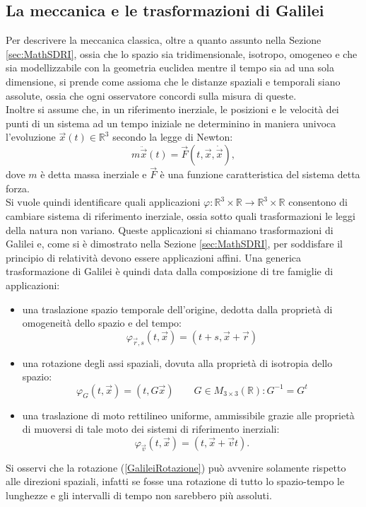 \subsection{La meccanica e le trasformazioni di Galilei}\label{sec:MC}
Per descrivere la meccanica classica, oltre a quanto assunto nella Sezione \ref{sec:MathSDRI}, ossia che lo spazio sia tridimensionale, isotropo, omogeneo e che sia modellizzabile con la geometria euclidea mentre il tempo sia ad una sola dimensione, si prende come assioma che le distanze spaziali e temporali siano assolute, ossia che ogni osservatore concordi sulla misura di queste.\\
Inoltre si assume che, in un riferimento inerziale, le posizioni e le velocità dei punti di un sistema ad un tempo iniziale ne determinino in maniera univoca l'evoluzione $\vec x(t)\in \mathbb{R}^3$ secondo la legge di Newton:
\begin{equation}
	m\ddot{\vec{x}}(t)=\vec{F}(t,\vec{x},\dot{\vec{x}}),
	\label{equazioneDiNewton}
\end{equation}
dove $m$ è detta massa inerziale e $\vec{F}$ è una funzione caratteristica del sistema detta forza.\\

Si vuole quindi identificare quali applicazioni $\varphi:\mathbb{R}^3\times\mathbb{R}\rightarrow
\mathbb{R}^3\times\mathbb{R}$ consentono di cambiare sistema di riferimento inerziale, ossia sotto quali 
trasformazioni le leggi della natura non variano. Queste applicazioni si chiamano trasformazioni di 
Galilei e, come si è dimostrato nella Sezione \ref{sec:MathSDRI}, per soddisfare il principio di relatività devono essere applicazioni affini.
Una generica trasformazione di Galilei è quindi data dalla composizione di tre famiglie di applicazioni:
\begin{itemize}
	\item una traslazione spazio temporale dell'origine, dedotta dalla proprietà 
	di omogeneità dello spazio e del tempo:
	\begin{equation}
		\varphi_{\vec{r},s}(t,\vec{x})=(t+s,\vec{x}+\vec{r})
		\label{GalileiTraslazoine}
	\end{equation} 
\item una rotazione degli assi spaziali, dovuta alla proprietà di isotropia dello spazio:
\begin{equation}
	\varphi_{G}(t,\vec{x})=(t,G\vec{x}) \qquad G\in M_{3\times3}(\mathbb{R}):G^{-1}=G^t
	\label{GalileiRotazione}
\end{equation} 
	\item una traslazione di moto rettilineo uniforme, ammissibile grazie alle proprietà di muoversi di tale moto dei sistemi 
	di riferimento inerziali:
\begin{equation}
	\varphi_{\vec{v}}(t,\vec{x})=(t,\vec{x}+\vec{v}t).
	\label{GalileiVelocità}
\end{equation} 
\end{itemize}
Si osservi che la rotazione (\ref{GalileiRotazione}) può avvenire solamente rispetto alle direzioni spaziali, infatti se fosse una rotazione di tutto lo spazio-tempo le lunghezze e gli intervalli di tempo non sarebbero più assoluti.\\

